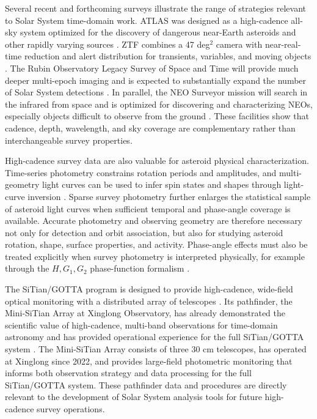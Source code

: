 \documentclass[referee]{raa}
\begin{document}
Several recent and forthcoming surveys illustrate the range of strategies relevant to Solar System time-domain work. ATLAS was designed as a high-cadence all-sky system optimized for the discovery of dangerous near-Earth asteroids and other rapidly varying sources \citep{Tonry2018}. ZTF combines a 47 deg$^2$ camera with near-real-time reduction and alert distribution for transients, variables, and moving objects \citep{Bellm2019,Patterson2019}. The Rubin Observatory Legacy Survey of Space and Time will provide much deeper multi-epoch imaging and is expected to substantially expand the number of Solar System detections \citep{Ivezic2019,Jones2018,Schwamb2023}. In parallel, the NEO Surveyor mission will search in the infrared from space and is optimized for discovering and characterizing NEOs, especially objects difficult to observe from the ground \citep{Mainzer2023}. These facilities show that cadence, depth, wavelength, and sky coverage are complementary rather than interchangeable survey properties.

High-cadence survey data are also valuable for asteroid physical characterization. Time-series photometry constrains rotation periods and amplitudes, and multi-geometry light curves can be used to infer spin states and shapes through light-curve inversion \citep{Kaasalainen2001a,Kaasalainen2001b,Warner2009}. Sparse survey photometry further enlarges the statistical sample of asteroid light curves when sufficient temporal and phase-angle coverage is available. Accurate photometry and observing geometry are therefore necessary not only for detection and orbit association, but also for studying asteroid rotation, shape, surface properties, and activity. Phase-angle effects must also be treated explicitly when survey photometry is interpreted physically, for example through the $H,G_1,G_2$ phase-function formalism \citep{Muinonen2010}.

The SiTian/GOTTA program is designed to provide high-cadence, wide-field optical monitoring with a distributed array of telescopes \citep{Liu2021}. Its pathfinder, the Mini-SiTian Array at Xinglong Observatory, has already demonstrated the scientific value of high-cadence, multi-band observations for time-domain astronomy and has provided operational experience for the full SiTian/GOTTA system \citep{Huang2025MiniSitian,Han2025MiniSitianWhitePaper}. The Mini-SiTian Array consists of three 30 cm telescopes, has operated at Xinglong since 2022, and provides large-field photometric monitoring that informs both observation strategy and data processing for the full SiTian/GOTTA system. These pathfinder data and procedures are directly relevant to the development of Solar System analysis tools for future high-cadence survey operations.
\end{document}
